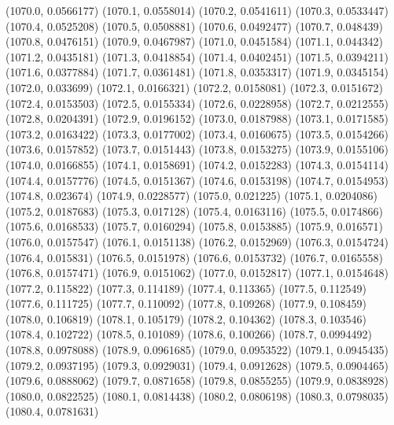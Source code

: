 {					(1070.0, 0.0566177)
					(1070.1, 0.0558014)
					(1070.2, 0.0541611)
					(1070.3, 0.0533447)
					(1070.4, 0.0525208)
					(1070.5, 0.0508881)
					(1070.6, 0.0492477)
					(1070.7, 0.048439)
					(1070.8, 0.0476151)
					(1070.9, 0.0467987)
					(1071.0, 0.0451584)
					(1071.1, 0.044342)
					(1071.2, 0.0435181)
					(1071.3, 0.0418854)
					(1071.4, 0.0402451)
					(1071.5, 0.0394211)
					(1071.6, 0.0377884)
					(1071.7, 0.0361481)
					(1071.8, 0.0353317)
					(1071.9, 0.0345154)
					(1072.0, 0.033699)
					(1072.1, 0.0166321)
					(1072.2, 0.0158081)
					(1072.3, 0.0151672)
					(1072.4, 0.0153503)
					(1072.5, 0.0155334)
					(1072.6, 0.0228958)
					(1072.7, 0.0212555)
					(1072.8, 0.0204391)
					(1072.9, 0.0196152)
					(1073.0, 0.0187988)
					(1073.1, 0.0171585)
					(1073.2, 0.0163422)
					(1073.3, 0.0177002)
					(1073.4, 0.0160675)
					(1073.5, 0.0154266)
					(1073.6, 0.0157852)
					(1073.7, 0.0151443)
					(1073.8, 0.0153275)
					(1073.9, 0.0155106)
					(1074.0, 0.0166855)
					(1074.1, 0.0158691)
					(1074.2, 0.0152283)
					(1074.3, 0.0154114)
					(1074.4, 0.0157776)
					(1074.5, 0.0151367)
					(1074.6, 0.0153198)
					(1074.7, 0.0154953)
					(1074.8, 0.023674)
					(1074.9, 0.0228577)
					(1075.0, 0.021225)
					(1075.1, 0.0204086)
					(1075.2, 0.0187683)
					(1075.3, 0.017128)
					(1075.4, 0.0163116)
					(1075.5, 0.0174866)
					(1075.6, 0.0168533)
					(1075.7, 0.0160294)
					(1075.8, 0.0153885)
					(1075.9, 0.016571)
					(1076.0, 0.0157547)
					(1076.1, 0.0151138)
					(1076.2, 0.0152969)
					(1076.3, 0.0154724)
					(1076.4, 0.015831)
					(1076.5, 0.0151978)
					(1076.6, 0.0153732)
					(1076.7, 0.0165558)
					(1076.8, 0.0157471)
					(1076.9, 0.0151062)
					(1077.0, 0.0152817)
					(1077.1, 0.0154648)
					(1077.2, 0.115822)
					(1077.3, 0.114189)
					(1077.4, 0.113365)
					(1077.5, 0.112549)
					(1077.6, 0.111725)
					(1077.7, 0.110092)
					(1077.8, 0.109268)
					(1077.9, 0.108459)
					(1078.0, 0.106819)
					(1078.1, 0.105179)
					(1078.2, 0.104362)
					(1078.3, 0.103546)
					(1078.4, 0.102722)
					(1078.5, 0.101089)
					(1078.6, 0.100266)
					(1078.7, 0.0994492)
					(1078.8, 0.0978088)
					(1078.9, 0.0961685)
					(1079.0, 0.0953522)
					(1079.1, 0.0945435)
					(1079.2, 0.0937195)
					(1079.3, 0.0929031)
					(1079.4, 0.0912628)
					(1079.5, 0.0904465)
					(1079.6, 0.0888062)
					(1079.7, 0.0871658)
					(1079.8, 0.0855255)
					(1079.9, 0.0838928)
					(1080.0, 0.0822525)
					(1080.1, 0.0814438)
					(1080.2, 0.0806198)
					(1080.3, 0.0798035)
					(1080.4, 0.0781631)
}

